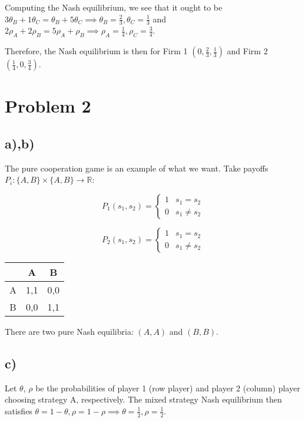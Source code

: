 \documentclass[12pt,letterpaper]{article}
\theoremstyle{definition}
\begin{document}
Computing the Nash equilibrium, we see that it ought to be $3\theta_B + 1\theta_C =
\theta_B + 5\theta_C \implies \theta_B = \frac{2}{3}, \theta_C = \frac{1}{3}$
and $2\rho_A + 2 \rho_B = 5\rho_A + \rho_B \implies \rho_A = \frac{1}{4}, \rho_C
= \frac{3}{4}$.

Therefore, the Nash equilibrium is then for Firm 1 $(0,\frac{2}{3},\frac{1}{3})$ and Firm
2 $(\frac{1}{4},0,\frac{3}{4})$.


\section*{Problem 2}

\subsection*{a),b)}

The pure cooperation game is an example of what we want. Take payoffs $P_i:
\{A,B\}\times\{A,B\} \rightarrow \mathbb{R}$:

\[
  P_1(s_1,s_2) = \begin{cases}
    1 & s_1 = s_2 \\
    0 & s_1 \neq s_2
  \end{cases}
\]

\[
  P_2(s_1,s_2) = \begin{cases}
    1 & s_1 = s_2 \\
    0 & s_1 \neq s_2
  \end{cases}
\]

\begin{center}
  \begin{tabular}{c|c|c}
    & A & B \\
    \hline
    A & 1,1 & 0,0\\
    \hline
    B & 0,0 & 1,1
  \end{tabular}
\end{center}

There are two pure Nash equilibria: $(A,A)$ and $(B,B)$.

\subsection*{c)}

Let $\theta$, $\rho$ be the probabilities of player 1 (row player) and player 2
(column) player choosing strategy A, respectively.
The mixed strategy Nash equilibrium then satisfies $\theta = 1 - \theta, \rho = 1 - \rho
\implies \theta = \frac{1}{2}, \rho = \frac{1}{2}$.
\end{document}
